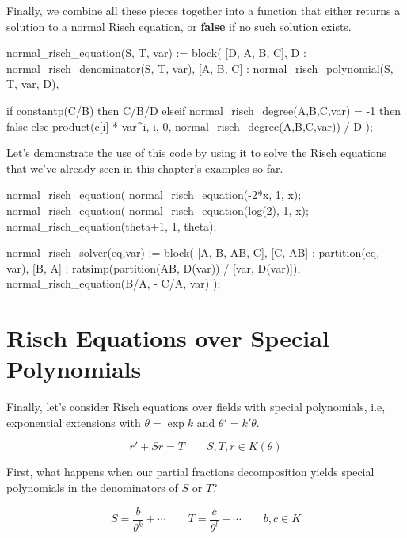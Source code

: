 Finally, we combine all these pieces together into a function that
either returns a solution to a normal Risch equation, or {\bf false}
if no such solution exists.

\begin{maximacommon}
normal_risch_equation(S, T, var) := block(
   [D, A, B, C],
   D : normal_risch_denominator(S, T, var),
   [A, B, C] : normal_risch_polynomial(S, T, var, D),

   if constantp(C/B) then C/B/D
   elseif normal_risch_degree(A,B,C,var) = -1
      then false
   else product(c[i] * var^i, i, 0,
                normal_risch_degree(A,B,C,var))
        / D
);
\end{maximacommon}

Let's demonstrate the use of this code by using it to solve the Risch
equations that we've already seen in this chapter's examples so far.

\begin{maximablock}
normal_risch_equation(%
normal_risch_equation(-2*x, 1, x);
normal_risch_equation(%
normal_risch_equation(log(2), 1, x);
normal_risch_equation(theta+1, 1, theta);
\end{maximablock}

\begin{maximacommon}
normal_risch_solver(eq,var) := block(
   [A, B, AB, C],
   [C, AB] : partition(eq, var),
   [B, A] : ratsimp(partition(AB, D(var))
          / [var, D(var)]),
   normal_risch_equation(B/A, - C/A, var)
);
\end{maximacommon}

\vfill\eject
\section{Risch Equations over Special Polynomials}

Finally, let's consider Risch equations over fields
with special polynomials, i.e, exponential extensions
with $\theta = \exp k$ and $\theta' = k' \theta$.

$$r' + S r = T \qquad S,T,r \in K(\theta)$$

First, what happens when our partial
fractions decomposition yields special polynomials
in the denominators of $S$ or $T$?

$$S = \frac{b}{\theta^k} + \cdots \qquad T = \frac{c}{\theta^l} + \cdots \qquad b,c \in K$$



